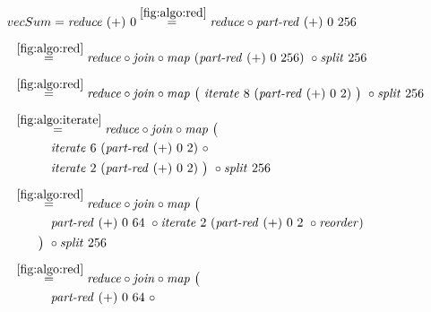 \begin{align*}
  &\hspace{-1.5em}vecSum = \reduce\ (+)\ 0
%
  \overset{\ref{fig:algo:red}}{=\hspace{.2em}}
      \reduce \circ \partRed\ (+)\ 0\ 256\\[.5em]
%
  &\hspace{-2em}\quad\begin{aligned}
    &\overset{\ref{fig:algo:red}}{=\hspace{.2em}}
      \reduce \circ \join \circ \map\ (\partRed\ (+)\ 0\ 256)\ \circ \splitN\ 256
  \end{aligned}\\[.5em]
%
  &\hspace{-2em}\quad\begin{aligned}
    &\overset{\ref{fig:algo:red}}{=\hspace{.2em}}
      \reduce \circ \join \circ \map\ \big(\ \iterateN\ 8\ (\partRed\ (+)\ 0\ 2)\ \big)\ \circ \splitN\ 256
  \end{aligned}\\[.5em]
%
  &\hspace{-2em}\quad\begin{aligned}
    &\overset{\ref{fig:algo:iterate}}{=\hspace{.2em}}
      \reduce \circ \join \circ \map\ \big(\\
    &\qquad\quad\iterateN\ 6\ (\partRed\ (+)\ 0\ 2)\ \circ\\
    &\qquad\quad\iterateN\ 2\ (\partRed\ (+)\ 0\ 2)\ \big)\ \circ \splitN\ 256
  \end{aligned}\\[.5em]
%
  &\hspace{-2em}\quad\begin{aligned}
    &\overset{\ref{fig:algo:red}}{=\hspace{.2em}}
      \reduce \circ \join \circ \map\ \big(\\
    &\qquad\quad\partRed\ (+)\ 0\ 64\ \circ \iterateN\ 2\ (\partRed\ (+)\ 0\ 2\ \circ \reorder)\\
    &\qquad\big)\ \circ \splitN\ 256
  \end{aligned}\\[.5em]
%
  &\hspace{-2em}\quad\begin{aligned}
    &\overset{\ref{fig:algo:red}}{=\hspace{.2em}}
      \reduce \circ \join \circ \map\ \big(\\
    &\qquad\quad\partRed\ (+)\ 0\ 64\ \circ\\

\end{aligned}
\end{align*}
